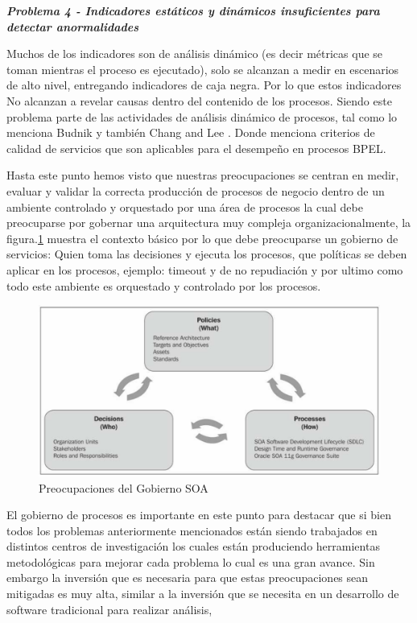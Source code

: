 \documentclass[spanish]{article}
\begin{document}
\textbf{\emph{Problema 4 - Indicadores estáticos y dinámicos insuficientes
para detectar anormalidades}}

Muchos de los indicadores son de análisis dinámico (es decir métricas
que se toman mientras el proceso es ejecutado), solo se alcanzan a
medir en escenarios de alto nivel, entregando indicadores de caja
negra. Por lo que estos indicadores No alcanzan a revelar causas dentro
del contenido de los procesos. Siendo este problema parte de las actividades
de análisis dinámico de procesos, tal como lo menciona Budnik \cite{Budnik2011}
y también Chang and Lee \cite{Chang2009}. Donde menciona criterios
de calidad de servicios que son aplicables para el desempeño en procesos
BPEL.

Hasta este punto hemos visto que nuestras preocupaciones se centran
en medir, evaluar y validar la correcta producción de procesos de
negocio dentro de un ambiente controlado y orquestado por una área
de procesos la cual debe preocuparse por gobernar una arquitectura
muy compleja organizacionalmente, la figura.\ref{fig:Preocupaciones-del-Govierno}
muestra el contexto básico por lo que debe preocuparse un gobierno
de servicios: Quien toma las decisiones y ejecuta los procesos, que
políticas se deben aplicar en los procesos, ejemplo: timeout y de
no repudiación y por ultimo como todo este ambiente es orquestado
y controlado por los procesos.

\begin{figure}
\centering{}\caption{ \label{fig:Preocupaciones-del-Govierno}Preocupaciones del Gobierno
SOA\cite{Weir2013}}


\raggedright{}\includegraphics[scale=0.6]{img/SOAGovernanceConcerns} 
\end{figure}


El gobierno de procesos es importante en este punto para destacar
que si bien todos los problemas anteriormente mencionados están siendo
trabajados en distintos centros de investigación los cuales están
produciendo herramientas metodológicas para mejorar cada problema
lo cual es una gran avance. Sin embargo la inversión que es necesaria
para que estas preocupaciones sean mitigadas es muy alta, similar
a la inversión que se necesita en un desarrollo de software tradicional
para realizar análisis,
\end{document}
